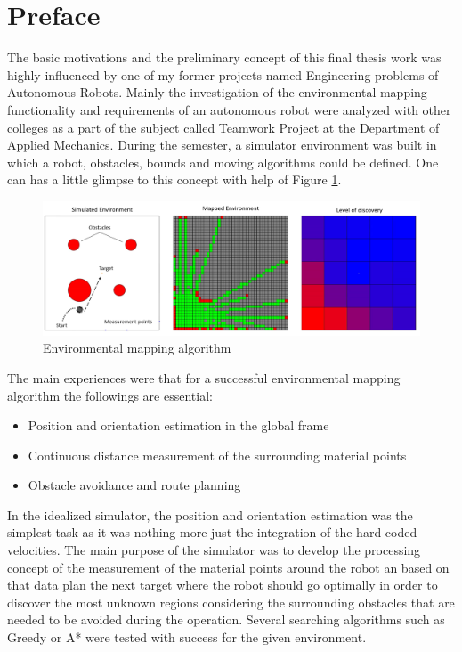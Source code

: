 \documentclass[12pt,english,twoside]{article}
\begin{document}

\newpage

\section*{Preface}
The basic motivations and the preliminary concept of this final thesis work was highly influenced by one of my former projects named Engineering problems of Autonomous Robots. Mainly the investigation of the environmental mapping functionality and requirements of an autonomous robot were analyzed with other colleges as a part of the subject called Teamwork Project at the Department of Applied Mechanics. During the semester, a simulator environment was built in which a robot, obstacles, bounds and moving algorithms could be defined. One can has a little glimpse to this concept with help of Figure \ref{glimpse}.
\begin{figure}[h]
	\centering
	\includegraphics[width=\textwidth]{figures/glimpse.png}
	\caption{Environmental mapping algorithm}
	\label{glimpse}
\end{figure}

The main experiences were that for a successful environmental mapping algorithm the followings are essential:
\begin{itemize}
	\item Position and orientation estimation in the global frame
	\item Continuous distance measurement of the surrounding material points
	\item Obstacle avoidance and route planning
\end{itemize}

In the idealized simulator, the position and orientation estimation was the simplest task as it was nothing more just the integration of the hard coded velocities. The main purpose of the simulator was to develop the processing concept of the measurement of the material points around the robot an based on that data plan the next target where the robot should go optimally in order to discover the most unknown regions considering the surrounding obstacles that are needed to be avoided during the operation. Several searching algorithms such as Greedy or A* were tested with success for the given environment. 
\end{document}
